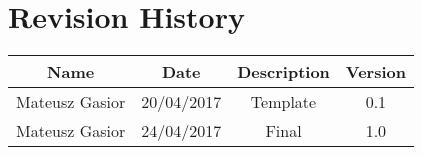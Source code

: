 \chapter*{Revision History}

\begin{center}
    \begin{tabular}{|c|c|c|c|}
        \hline
	    Name & Date & Description & Version\\ \hline
 	    Mateusz Gasior & 20/04/2017 & Template & 0.1\\ \hline
 	    Mateusz Gasior & 24/04/2017 & Final & 1.0\\ \hline
    \end{tabular}
\end{center}
